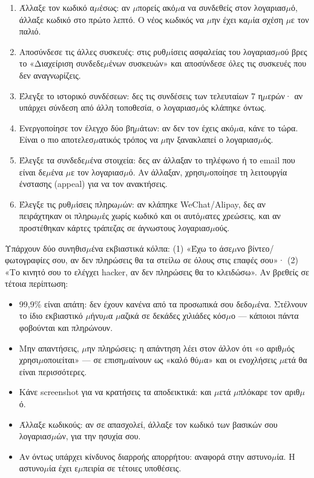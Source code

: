 \begin{enumerate}
  \item Άλλαξε τον κωδικό α$\mu$έσως: αν $\mu$πορείς ακό$\mu$α να συνδεθείς στον λογαριασ$\mu$ό, άλλαξε κωδικό στο πρώτο λεπτό. Ο νέος κωδικός να $\mu$ην έχει κα$\mu$ία σχέση $\mu$ε τον παλιό.
  \item Αποσύνδεσε τις άλλες συσκευές: στις ρυθ$\mu$ίσεις ασφαλείας του λογαριασ$\mu$ού βρες το «Διαχείριση συνδεδε$\mu$ένων συσκευών» και αποσύνδεσε όλες τις συσκευές που δεν αναγνωρίζεις.
  \item Έλεγξε το ιστορικό συνδέσεων: δες τις συνδέσεις των τελευταίων 7 η$\mu$ερών· αν υπάρχει σύνδεση από άλλη τοποθεσία, ο λογαριασ$\mu$ός κλάπηκε όντως.
  \item Ενεργοποίησε τον έλεγχο δύο βη$\mu$άτων: αν δεν τον έχεις ακό$\mu$α, κάνε το τώρα. Είναι ο πιο αποτελεσ$\mu$ατικός τρόπος να $\mu$ην ξανακλαπεί ο λογαριασ$\mu$ός.
  \item Έλεγξε τα συνδεδε$\mu$ένα στοιχεία: δες αν άλλαξαν το τηλέφωνο ή το email που είναι δε$\mu$ένα $\mu$ε τον λογαριασ$\mu$ό. Αν άλλαξαν, χρησι$\mu$οποίησε τη λειτουργία ένστασης (appeal) για να τον ανακτήσεις.
  \item Έλεγξε τις ρυθ$\mu$ίσεις πληρω$\mu$ών: αν κλάπηκε WeChat/Alipay, δες αν πειράχτηκαν οι πληρω$\mu$ές χωρίς κωδικό και οι αυτό$\mu$ατες χρεώσεις, και αν προστέθηκαν κάρτες τράπεζας σε άγνωστους λογαριασ$\mu$ούς.
\end{enumerate}


Υπάρχουν δύο συνηθισ$\mu$ένα εκβιαστικά κόλπα: (1) «Έχω το άσε$\mu$νο βίντεο/φωτογραφίες σου, αν δεν πληρώσεις θα τα στείλω σε όλους στις επαφές σου»· (2) «Το κινητό σου το ελέγχει hacker, αν δεν πληρώσεις θα το κλειδώσω». Αν βρεθείς σε τέτοια περίπτωση:

\begin{itemize}
  \item 99,9\% είναι απάτη: δεν έχουν κανένα από τα προσωπικά σου δεδο$\mu$ένα. Στέλνουν το ίδιο εκβιαστικό $\mu$ήνυ$\mu$α $\mu$αζικά σε δεκάδες χιλιάδες κόσ$\mu$ο — κάποιοι πάντα φοβούνται και πληρώνουν.
  \item Μην απαντήσεις, $\mu$ην πληρώσεις: η απάντηση λέει στον άλλον ότι «ο αριθ$\mu$ός χρησι$\mu$οποιείται» — σε επιση$\mu$αίνουν ως «καλό θύ$\mu$α» και οι ενοχλήσεις $\mu$ετά θα είναι περισσότερες.
  \item Κάνε screenshot για να κρατήσεις τα αποδεικτικά: και $\mu$ετά $\mu$πλόκαρε τον αριθ$\mu$ό.
  \item Άλλαξε κωδικούς: αν σε απασχολεί, άλλαξε τον κωδικό των βασικών σου λογαριασ$\mu$ών, για την ησυχία σου.
  \item Αν όντως υπάρχει κίνδυνος διαρροής απορρήτου: αναφορά στην αστυνο$\mu$ία. Η αστυνο$\mu$ία έχει ε$\mu$πειρία σε τέτοιες υποθέσεις.
\end{itemize}


